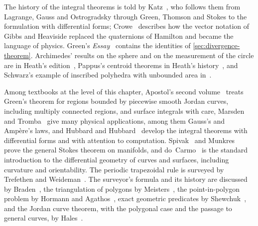 The history of the integral theorems is told by Katz~\cite{katz1979}, who follows them from Lagrange, Gauss and Ostrogradsky through Green, Thomson and Stokes to the formulation with differential forms; Crowe~\cite{crowe1967} describes how the vector notation of Gibbs and Heaviside replaced the quaternions of Hamilton and became the language of physics. Green's \emph{Essay}~\cite{green1828} contains the identities of \cref{sec:divergence-theorem}. Archimedes' results on the sphere and on the measurement of the circle are in Heath's edition~\cite{heath1897archimedes}, Pappus's centroid theorems in Heath's history~\cite{heath1921}, and Schwarz's example of inscribed polyhedra with unbounded area in~\cite{schwarz1890}.

Among textbooks at the level of this chapter, Apostol's second volume~\cite{apostol1969calculus} treats Green's theorem for regions bounded by piecewise smooth Jordan curves, including multiply connected regions, and surface integrals with care, Marsden and Tromba~\cite{marsden2012vector} give many physical applications, among them Gauss's and Amp\`ere's laws, and Hubbard and Hubbard~\cite{hubbard2015vector} develop the integral theorems with differential forms and with attention to computation. Spivak~\cite{spivak1965manifolds} and Munkres~\cite{munkres1991} prove the general Stokes theorem on manifolds, and do~Carmo~\cite{docarmo1976} is the standard introduction to the differential geometry of curves and surfaces, including curvature and orientability. The periodic trapezoidal rule is surveyed by Trefethen and Weideman~\cite{trefethen2014}. The surveyor's formula and its history are discussed by Braden~\cite{braden1986}, the triangulation of polygons by Meisters~\cite{meisters1975}, the point-in-polygon problem by Hormann and Agathos~\cite{hormann2001}, exact geometric predicates by Shewchuk~\cite{shewchuk1997}, and the Jordan curve theorem, with the polygonal case and the passage to general curves, by Hales~\cite{hales2007}.

\chapterreferences
